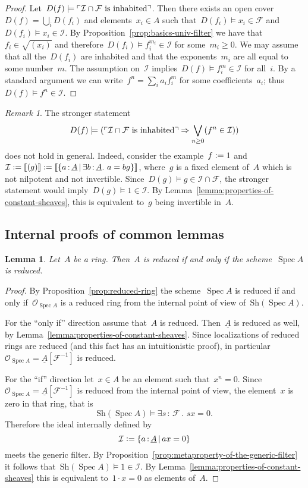 \documentclass[10pt]{amsart}
\theoremstyle{definition}
\theoremstyle{plain}
\newtheorem{lemma}[defn]{Lemma}
\theoremstyle{remark}
\newtheorem{rem}[defn]{Remark}
\newcommand{\F}{\mathcal{F}}
\renewcommand{\O}{\mathcal{O}}
\newcommand{\I}{\mathcal{I}}
\newcommand{\ul}[1]{\underline{#1}}
\newcommand{\Sh}{\mathrm{Sh}}
\DeclareMathOperator{\Spec}{Spec}
\newcommand{\?}{\,{:}\,}
\renewcommand{\_}{\mathpunct{.}\,}
\newcommand{\speak}[1]{\ulcorner\text{\textnormal{#1}}\urcorner}
\newcommand{\brak}[1]{{\llbracket{#1}\rrbracket}}
\newcommand{\defeq}{\vcentcolon=}
\begin{document}
\begin{proof}\label{prop:metaproperty-of-the-generic-filter}
Let~$D(f) \models \speak{$\I \cap \F$ is inhabited}$. Then there
exists an open cover~$D(f) = \bigcup_i D(f_i)$ and elements~$x_i \in A$ such
that~$D(f_i) \models x_i \in \F$ and~$D(f_i) \models x_i \in \I$. By
Proposition~\ref{prop:basics-univ-filter} we have that~$f_i \in \sqrt{(x_i)}$
and therefore~$D(f_i) \models f_i^{m_i} \in \I$ for some~$m_i \geq 0$. We may
assume that all the~$D(f_i)$ are inhabited and that the exponents~$m_i$ are all
equal to some number~$m$. The assumption on~$\I$ implies~$D(f) \models f_i^m
\in \I$ for all~$i$. By a standard argument we can write~$f^n = \sum_i a_i
f_i^m$ for some coefficients~$a_i$; thus~$D(f) \models f^n \in \I$.
\end{proof}

\begin{rem}The stronger statement
\[ D(f) \models (\speak{$\I \cap \F$ is inhabited} \Rightarrow \bigvee_{n \geq
0} (f^n \in \I)) \]
does not hold in general. Indeed, consider the example~$f \defeq 1$ and~$\I \defeq
\brak{(g)} \defeq \brak{\{ a\?\ul{A} \,|\, \exists b\?\ul{A}\_ a = bg \}}$,
where~$g$ is a fixed element of~$A$ which is not nilpotent and not invertible.
Since~$D(g) \models g \in \I \cap \F$, the stronger statement would imply~$D(g)
\models 1 \in \I$. By Lemma~\ref{lemma:properties-of-constant-sheaves}, this is
equivalent to~$g$ being invertible in~$A$.
\end{rem}


\subsection{Internal proofs of common lemmas}

\begin{lemma}Let~$A$ be a ring. Then~$A$ is reduced if and only if the
scheme~$\Spec A$ is reduced.\end{lemma}
\begin{proof}By Proposition~\ref{prop:reduced-ring} the scheme~$\Spec A$ is
reduced if and only if~$\O_{\Spec A}$ is a reduced ring
from the internal point of view of~$\Sh(\Spec A)$.

For the ``only if'' direction assume that~$A$ is reduced. Then~$\ul{A}$ is
reduced as well, by Lemma~\ref{lemma:properties-of-constant-sheaves}. Since
localizations of reduced rings are reduced (and this fact has an intuitionistic
proof), in particular~$\O_{\Spec A} = \ul{A}[\F^{-1}]$ is reduced.

For the ``if'' direction let~$x \in A$ be an element such that~$x^n = 0$.
Since~$\O_{\Spec A} = \ul{A}[\F^{-1}]$ is reduced from the internal point of
view, the element~$x$ is zero in that ring, that is
\[ \Sh(\Spec A) \models \exists s\?\F\_ sx = 0. \]
Therefore the ideal internally defined by
\[ \I \defeq \{ a\?\ul{A} \,|\, ax = 0 \} \]
meets the generic filter. By
Proposition~\ref{prop:metaproperty-of-the-generic-filter} it follows
that~$\Sh(\Spec A) \models 1 \in \I$. By
Lemma~\ref{lemma:properties-of-constant-sheaves} this is equivalent to~$1 \cdot
x = 0$ as elements of~$A$.
\end{proof}
\end{document}
